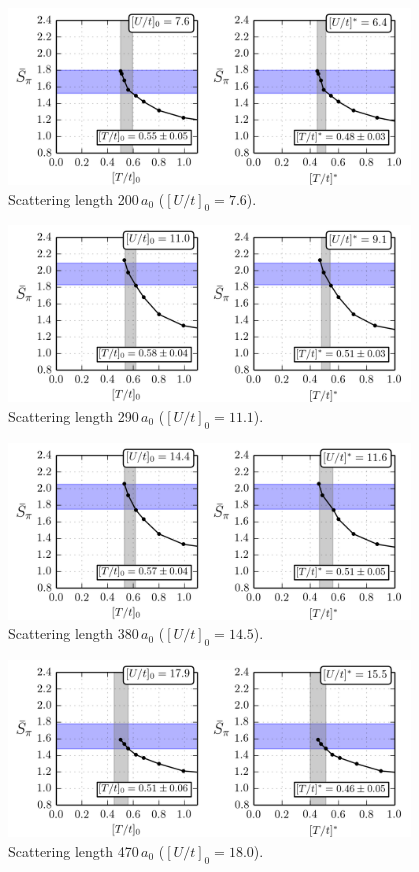 \documentclass[11pt,letter]{article}
\begin{document}
 
\begin{figure}
    \centering
\includegraphics[width=0.95\textwidth]{figures/200a0_spi.png}
\caption{Scattering length 200\,$a_{0}$ ($[U/t]_{0}=7.6$).  } 
\label{fig:200a0_varyT}
\end{figure}
\begin{figure}
    \centering
\includegraphics[width=0.95\textwidth]{figures/290a0_spi.png}
\caption{Scattering length 290\,$a_{0}$ ($[U/t]_{0}=11.1$).   } 
\label{fig:290a0_varyT}
\end{figure}
\begin{figure}
    \centering
\includegraphics[width=0.95\textwidth]{figures/380a0_spi.png}
\caption{Scattering length 380\,$a_{0}$ ($[U/t]_{0}=14.5$).   } 
\label{fig:380a0_varyT}
\end{figure}
\begin{figure}
    \centering
\includegraphics[width=0.95\textwidth]{figures/470a0_spi.png}
\caption{Scattering length 470\,$a_{0}$ ($[U/t]_{0}=18.0$).   } 
\label{fig:470a0_varyT}
\end{figure} 

 
 

 
 
\end{document}

